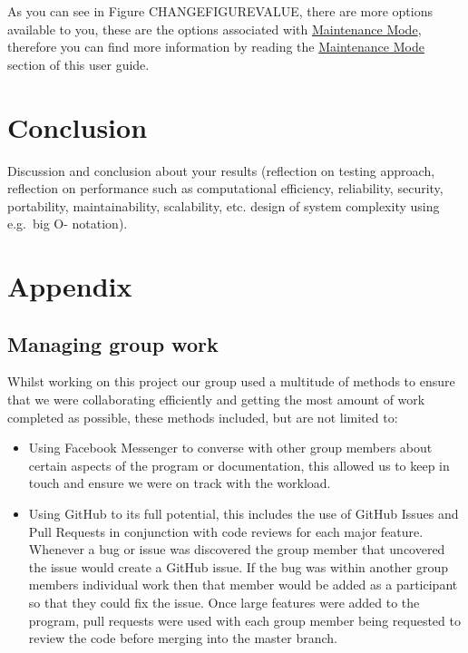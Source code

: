 \documentclass[
  english,
  a4paper,
,tablecaptionabove
]{scrartcl}
\providecommand{\tightlist}{%
  \setlength{\itemsep}{0pt}\setlength{\parskip}{0pt}}
\begin{document}
As you can see in Figure CHANGEFIGUREVALUE, there are more options
available to you, these are the options associated with
\protect\hyperlink{using-maintenance-mode}{Maintenance Mode}, therefore
you can find more information by reading the
\protect\hyperlink{using-maintenance-mode}{Maintenance Mode} section of
this user guide.

\newpage

\hypertarget{conclusion}{%
\section{Conclusion}\label{conclusion}}

Discussion and conclusion about your results (reflection on testing
approach, reflection on performance such as computational efficiency,
reliability, security, portability, maintainability, scalability, etc.
design of system complexity using e.g.~big O- notation).

\newpage

\hypertarget{appendix}{%
\section{Appendix}\label{appendix}}

\hypertarget{managing-group-work}{%
\subsection{Managing group work}\label{managing-group-work}}

Whilst working on this project our group used a multitude of methods to
ensure that we were collaborating efficiently and getting the most
amount of work completed as possible, these methods included, but are
not limited to:

\begin{itemize}
\tightlist
\item
  Using Facebook Messenger to converse with other group members about
  certain aspects of the program or documentation, this allowed us to
  keep in touch and ensure we were on track with the workload.
\item
  Using GitHub to its full potential, this includes the use of GitHub
  Issues and Pull Requests in conjunction with code reviews for each
  major feature. Whenever a bug or issue was discovered the group member
  that uncovered the issue would create a GitHub issue. If the bug was
  within another group members individual work then that member would be
  added as a participant so that they could fix the issue. Once large
  features were added to the program, pull requests were used with each
  group member being requested to review the code before merging into
  the master branch.
\end{itemize}
\end{document}

